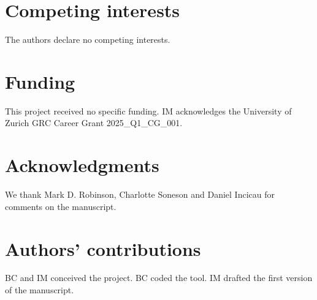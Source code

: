 \documentclass[10pt]{article}
\newcommand{\beginsupplement}{%
        \setcounter{table}{0}
        \renewcommand{\thetable}{S\arabic{table}}%
        \setcounter{figure}{0}
        \renewcommand{\thefigure}{S\arabic{figure}}%
        \setcounter{section}{0}
        \renewcommand{\thesection}{S\arabic{section}}%
      }
\begin{document}
\section*{Competing interests}

The authors declare no competing interests.

\section*{Funding}

This project received no specific funding. IM acknowledges the University of Zurich GRC Career Grant 2025\_Q1\_CG\_001.

\section*{Acknowledgments}

We thank Mark D. Robinson, Charlotte Soneson and Daniel Incicau for comments on the manuscript.

\section*{Authors' contributions}

BC and IM conceived the project. BC coded the tool. IM drafted the first version of the manuscript.




\clearpage


\end{document}
